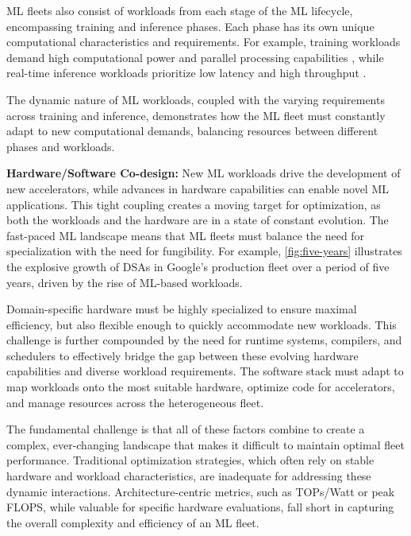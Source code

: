 ML fleets also consist of workloads from each stage of the ML lifecycle, encompassing training and inference phases. Each phase has its own unique computational characteristics and requirements. For example, training workloads demand high computational power and parallel processing capabilities \cite{kaplan2020scalinglawsneurallanguage}, while real-time inference workloads prioritize low latency and high throughput \cite{pope2023efficiently}. 

The dynamic nature of ML workloads, coupled with the varying requirements across training and inference, demonstrates how the ML fleet must constantly adapt to new computational demands, balancing resources between different phases and workloads.


{\textbf{Hardware/Software Co-design:}} New ML workloads drive the development of new accelerators, while advances in hardware capabilities can enable novel ML applications. This tight coupling creates a moving target for optimization, as both the workloads and the hardware are in a state of constant evolution. The fast-paced ML landscape means that ML fleets must balance the need for specialization with the need for fungibility. For example, \autoref{fig:five-years} illustrates the explosive growth of DSAs in Google's production fleet over a period of five years, driven by the rise of ML-based workloads. 

Domain-specific hardware must be highly specialized to ensure maximal efficiency, but also flexible enough to quickly accommodate new workloads. This challenge is further compounded by the need for runtime systems, compilers, and schedulers to effectively bridge the gap between these evolving hardware capabilities and diverse workload requirements. The software stack must adapt to map workloads onto the most suitable hardware, optimize code for accelerators, and manage resources across the heterogeneous fleet.

The fundamental challenge is that all of these factors combine to create a complex, ever-changing landscape that makes it difficult to maintain optimal fleet performance. Traditional optimization strategies, which often rely on stable hardware and workload characteristics, are inadequate for addressing these dynamic interactions. Architecture-centric metrics, such as TOPs/Watt or peak FLOPS, while valuable for specific hardware evaluations, fall short in capturing the overall complexity and efficiency of an ML fleet. 





